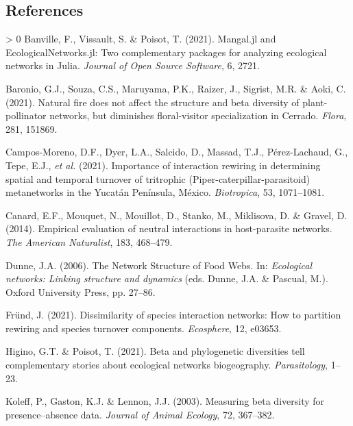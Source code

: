 \documentclass[10pt,oneside]{article}
\newlength{\cslhangindent}
\newenvironment{CSLReferences}[3] %
 {%
  \setlength{\parindent}{0pt}
  \ifodd #1 \everypar{\setlength{\hangindent}{\cslhangindent}}\ignorespaces\fi
  \ifnum #2 > 0
  \setlength{\parskip}{#2\baselineskip}
  \fi
 }%
 {}
\begin{document}
\hypertarget{references}{%
\subsection*{References}\label{references}}

\hypertarget{refs}{}
\begin{CSLReferences}{1}{0}
\leavevmode\hypertarget{ref-Banville2021ManJl}{}%
Banville, F., Vissault, S. \& Poisot, T. (2021). Mangal.jl and
EcologicalNetworks.jl: Two complementary packages for analyzing
ecological networks in Julia. \emph{Journal of Open Source Software}, 6,
2721.

\leavevmode\hypertarget{ref-Baronio2021NatFir}{}%
Baronio, G.J., Souza, C.S., Maruyama, P.K., Raizer, J., Sigrist, M.R. \&
Aoki, C. (2021). Natural fire does not affect the structure and beta
diversity of plant-pollinator networks, but diminishes floral-visitor
specialization in Cerrado. \emph{Flora}, 281, 151869.

\leavevmode\hypertarget{ref-Campos-Moreno2021ImpInt}{}%
Campos-Moreno, D.F., Dyer, L.A., Salcido, D., Massad, T.J.,
Pérez-Lachaud, G., Tepe, E.J., \emph{et al.} (2021). Importance of
interaction rewiring in determining spatial and temporal turnover of
tritrophic (Piper-caterpillar-parasitoid) metanetworks in the Yucatán
Península, México. \emph{Biotropica}, 53, 1071--1081.

\leavevmode\hypertarget{ref-Canard2014EmpEva}{}%
Canard, E.F., Mouquet, N., Mouillot, D., Stanko, M., Miklisova, D. \&
Gravel, D. (2014). Empirical evaluation of neutral interactions in
host-parasite networks. \emph{The American Naturalist}, 183, 468--479.

\leavevmode\hypertarget{ref-Dunne2006NetStr}{}%
Dunne, J.A. (2006). The Network Structure of Food Webs. In:
\emph{Ecological networks: Linking structure and dynamics} (eds. Dunne,
J.A. \& Pascual, M.). Oxford University Press, pp. 27--86.

\leavevmode\hypertarget{ref-Frund2021DisSpe}{}%
Fründ, J. (2021). Dissimilarity of species interaction networks: How to
partition rewiring and species turnover components. \emph{Ecosphere},
12, e03653.

\leavevmode\hypertarget{ref-Higino2021BetPhy}{}%
Higino, G.T. \& Poisot, T. (2021). Beta and phylogenetic diversities
tell complementary stories about ecological networks biogeography.
\emph{Parasitology}, 1--23.

\leavevmode\hypertarget{ref-Koleff2003MeaBet}{}%
Koleff, P., Gaston, K.J. \& Lennon, J.J. (2003). Measuring beta
diversity for presence--absence data. \emph{Journal of Animal Ecology},
72, 367--382.


\end{CSLReferences}
\end{document}
